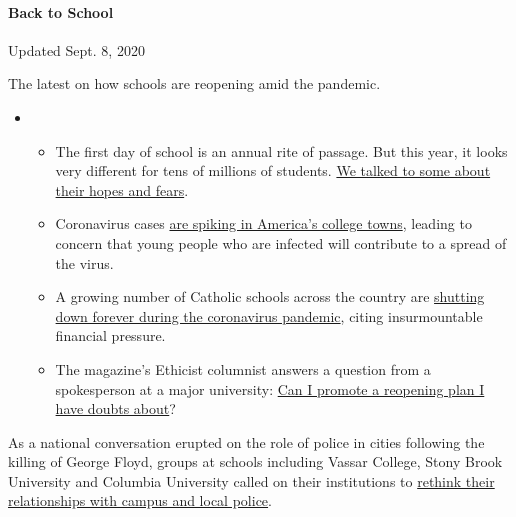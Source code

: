 \hypertarget{back-to-school}{%
\paragraph{Back to School}\label{back-to-school}}

Updated Sept. 8, 2020

The latest on how schools are reopening amid the pandemic.

\begin{itemize}
\item
  \begin{itemize}
  \tightlist
  \item
    The first day of school is an annual rite of passage. But this year,
    it looks very different for tens of millions of students.
    \href{https://www.nytimes3xbfgragh.onion/2020/09/05/us/virtual-return-to-school-covid.html?action=click\&pgtype=Article\&state=default\&region=MAIN_CONTENT_3\&context=storylines_keepup}{We
    talked to some about their hopes and fears}.
  \item
    Coronavirus cases
    \href{https://www.nytimes3xbfgragh.onion/2020/09/06/us/colleges-coronavirus-students.html?action=click\&pgtype=Article\&state=default\&region=MAIN_CONTENT_3\&context=storylines_keepup}{are
    spiking in America's college towns}, leading to concern that young
    people who are infected will contribute to a spread of the virus.
  \item
    A growing number of Catholic schools across the country are
    \href{https://www.nytimes3xbfgragh.onion/2020/09/05/us/catholic-school-closings.html?action=click\&pgtype=Article\&state=default\&region=MAIN_CONTENT_3\&context=storylines_keepup}{shutting
    down forever during the coronavirus pandemic}, citing insurmountable
    financial pressure.
  \item
    The magazine's Ethicist columnist answers a question from a
    spokesperson at a major university:
    \href{https://www.nytimes3xbfgragh.onion/2020/09/08/magazine/university-reopening-safety-ethics.html?action=click\&pgtype=Article\&state=default\&region=MAIN_CONTENT_3\&context=storylines_keepup}{Can
    I promote a reopening plan I have doubts about}?
  \end{itemize}
\end{itemize}

As a national conversation erupted on the role of police in cities
following the killing of George Floyd, groups at schools including
Vassar College, Stony Brook University and Columbia University called on
their institutions to
\href{https://www.insidehighered.com/news/2020/06/05/students-demand-universities-break-ties-local-police-few-have}{rethink
their relationships with campus and local police}.

